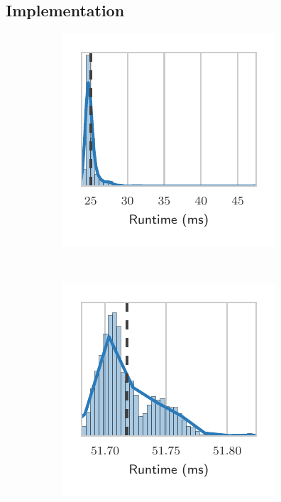 \documentclass[nonatbib,preprint,nocopyrightspace,9pt]{sigplanconf}
\begin{document}
\subsection{Implementation}

\begin{figure}
\begin{subfigure}[h]{.32\columnwidth}
\centering
\includegraphics[width=\textwidth]{img/runtimes_histogram_1}
\vspace{-1.5em} %
\caption{}
\label{fig:runtimes-histogram-1}
\end{subfigure}
~%
\begin{subfigure}[h]{.32\columnwidth}
\centering
\includegraphics[width=\textwidth]{img/runtimes_histogram_2}

\end{subfigure}
\end{figure}
\end{document}
